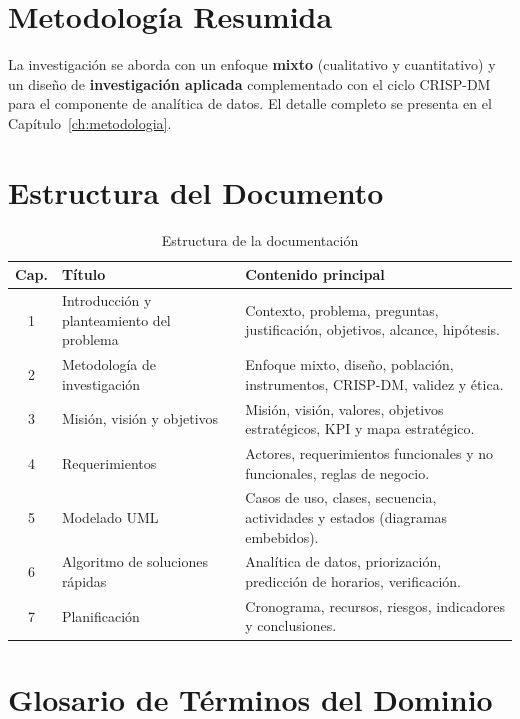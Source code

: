\section{Metodología Resumida}

La investigación se aborda con un enfoque \textbf{mixto} (cualitativo y
cuantitativo) y un diseño de \textbf{investigación aplicada} complementado con el
ciclo \ac{CRISP-DM} para el componente de analítica de datos. El detalle completo
se presenta en el Capítulo~\ref{ch:metodologia}.

\section{Estructura del Documento}

\begin{table}[H]
\centering
\caption{Estructura de la documentación}
\label{tab:estructura}
\begin{tabularx}{\textwidth}{@{}c l X@{}}
\toprule
\rowcolor{azulClaro}
\textbf{Cap.} & \textbf{Título} & \textbf{Contenido principal} \\
\midrule
1 & Introducción y planteamiento del problema &
    Contexto, problema, preguntas, justificación, objetivos, alcance, hipótesis. \\
2 & Metodología de investigación &
    Enfoque mixto, diseño, población, instrumentos, CRISP-DM, validez y ética. \\
3 & Misión, visión y objetivos &
    Misión, visión, valores, objetivos estratégicos, \ac{KPI} y mapa estratégico. \\
4 & Requerimientos &
    Actores, requerimientos funcionales y no funcionales, reglas de negocio. \\
5 & Modelado \ac{UML} &
    Casos de uso, clases, secuencia, actividades y estados (diagramas embebidos). \\
6 & Algoritmo de soluciones rápidas &
    Analítica de datos, priorización, predicción de horarios, verificación. \\
7 & Planificación &
    Cronograma, recursos, riesgos, indicadores y conclusiones. \\
\bottomrule
\end{tabularx}
\end{table}

\section{Glosario de Términos del Dominio}

